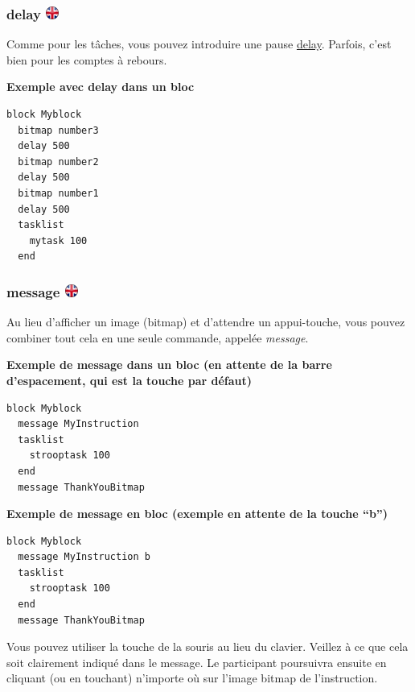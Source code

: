 \documentclass[
]{book}
\begin{document}
\hypertarget{delay-1}{%
\subsubsection[delay ]{\texorpdfstring{delay \href{https://www.psytoolkit.org/doc3.2.0/syntax.html\#block-delay}{\protect\includegraphics{img/ukflag.png}}}{delay }}\label{delay-1}}

Comme pour les tâches, vous pouvez introduire une pause \protect\hyperlink{delay}{delay}. Parfois, c'est bien pour les comptes à rebours.

\textbf{Exemple avec delay dans un bloc}

\begin{verbatim}
block Myblock
  bitmap number3
  delay 500
  bitmap number2
  delay 500
  bitmap number1
  delay 500
  tasklist
    mytask 100
  end
\end{verbatim}

\hypertarget{message}{%
\subsubsection[message ]{\texorpdfstring{message \href{https://www.psytoolkit.org/doc3.2.0/syntax.html\#block-message}{\protect\includegraphics{img/ukflag.png}}}{message }}\label{message}}

Au lieu d'afficher un image (bitmap) et d'attendre un appui-touche, vous pouvez combiner tout cela en une seule commande, appelée \emph{message}.

\textbf{Exemple de message dans un bloc (en attente de la barre d'espacement, qui est la touche par défaut)}

\begin{verbatim}
block Myblock
  message MyInstruction
  tasklist
    strooptask 100
  end
  message ThankYouBitmap
\end{verbatim}

\textbf{Exemple de message en bloc (exemple en attente de la touche ``b'')}

\begin{verbatim}
block Myblock
  message MyInstruction b
  tasklist
    strooptask 100
  end
  message ThankYouBitmap
\end{verbatim}

Vous pouvez utiliser la touche de la souris au lieu du clavier. Veillez à ce que cela soit clairement indiqué dans le message. Le participant poursuivra ensuite en cliquant (ou en touchant) n'importe où sur l'image bitmap de l'instruction.
\end{document}
